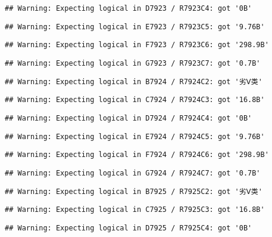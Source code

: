 \documentclass[
]{article}
\begin{document}
\begin{verbatim}
## Warning: Expecting logical in D7923 / R7923C4: got '0B'
\end{verbatim}

\begin{verbatim}
## Warning: Expecting logical in E7923 / R7923C5: got '9.76B'
\end{verbatim}

\begin{verbatim}
## Warning: Expecting logical in F7923 / R7923C6: got '298.9B'
\end{verbatim}

\begin{verbatim}
## Warning: Expecting logical in G7923 / R7923C7: got '0.7B'
\end{verbatim}

\begin{verbatim}
## Warning: Expecting logical in B7924 / R7924C2: got '劣Ⅴ类'
\end{verbatim}

\begin{verbatim}
## Warning: Expecting logical in C7924 / R7924C3: got '16.8B'
\end{verbatim}

\begin{verbatim}
## Warning: Expecting logical in D7924 / R7924C4: got '0B'
\end{verbatim}

\begin{verbatim}
## Warning: Expecting logical in E7924 / R7924C5: got '9.76B'
\end{verbatim}

\begin{verbatim}
## Warning: Expecting logical in F7924 / R7924C6: got '298.9B'
\end{verbatim}

\begin{verbatim}
## Warning: Expecting logical in G7924 / R7924C7: got '0.7B'
\end{verbatim}

\begin{verbatim}
## Warning: Expecting logical in B7925 / R7925C2: got '劣Ⅴ类'
\end{verbatim}

\begin{verbatim}
## Warning: Expecting logical in C7925 / R7925C3: got '16.8B'
\end{verbatim}

\begin{verbatim}
## Warning: Expecting logical in D7925 / R7925C4: got '0B'
\end{verbatim}
\end{document}
